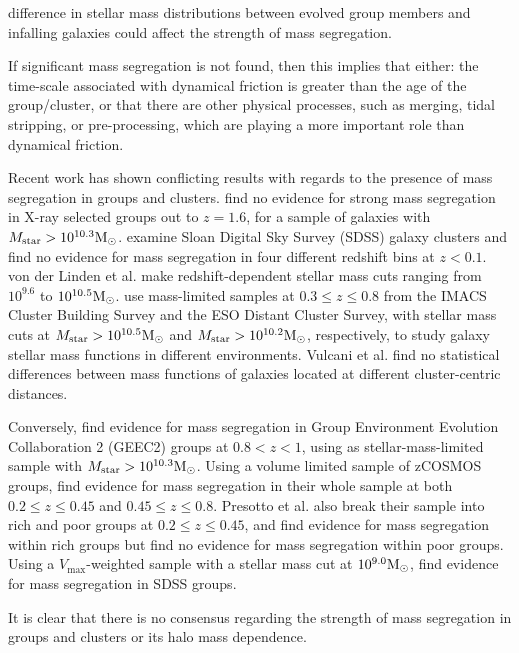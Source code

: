 difference in stellar mass distributions between evolved group members
and infalling galaxies could affect the strength of mass segregation.
\par
If significant mass segregation is not found, then this implies that
either: the time-scale associated with dynamical friction is greater
than the age of the group/cluster, or that there are other physical
processes, such as merging, tidal stripping, or pre-processing, which
are playing a more important role than dynamical friction.
\par
Recent work has shown conflicting results with regards to the presence
of mass segregation in groups and clusters.  \citet{ziparo2013} find
no evidence for strong mass segregation in X-ray selected groups out
to $z=1.6$, for a sample of galaxies with $M_\mathrm{star} >
10^{10.3}\mathrm{M_{\odot}}$.  \citet{vonderlinden2010} examine Sloan Digital Sky
Survey (SDSS) galaxy clusters and find no evidence for mass
segregation in four different redshift bins at $z < 0.1$.  von der
Linden et al. make redshift-dependent stellar mass cuts ranging from
$10^{9.6}$ to $10^{10.5}\mathrm{M_{\odot}}$.  \citet{vulcani2013} use mass-limited
samples at $0.3 \le z \le 0.8$ from the IMACS Cluster Building Survey
and the ESO Distant Cluster Survey, with stellar mass cuts at
$M_\mathrm{star} > 10^{10.5}\mathrm{M_{\odot}}$ and $M_\mathrm{star} >
10^{10.2}\mathrm{M_{\odot}}$, respectively, to study galaxy stellar mass functions
in different environments.  Vulcani et al. find no statistical
differences between mass functions of galaxies located at different
cluster-centric distances.
\par
Conversely, \citet{balogh2014} find evidence for mass segregation in
Group Environment Evolution Collaboration 2 (GEEC2) groups at $0.8 < z
< 1$, using as stellar-mass-limited sample with $M_\mathrm{star} >
10^{10.3}\mathrm{M_{\odot}}$.  Using a volume limited sample of zCOSMOS groups,
\citet{presotto2012} find evidence for mass segregation in their whole
sample at both $0.2 \le z \le 0.45$ and $0.45 \le z \le 0.8$.
Presotto et al. also break their sample into rich and poor groups at
$0.2 \le z \le 0.45$, and find evidence for mass segregation within
rich groups but find no evidence for mass segregation within poor
groups.  Using a $V_\mathrm{max}$-weighted sample with a stellar mass
cut at $10^{9.0}\mathrm{M_{\odot}}$, \citet{vandenbosch2008a} find evidence for mass
segregation in SDSS groups.
\par
It is clear that there is no consensus regarding the strength of mass
segregation in groups and clusters or its halo mass dependence.
\par
